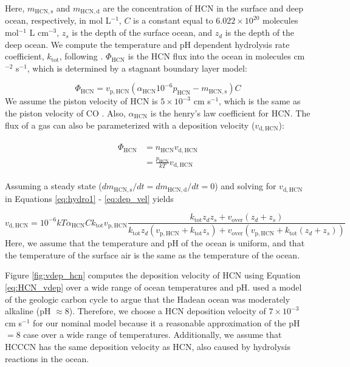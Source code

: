 Here, $m_\mathrm{HCN,s}$ and $m_\mathrm{HCN,d}$ are the concentration of HCN in the surface and deep ocean, respectively, in mol L$^{-1}$, $C$ is a constant equal to $6.022 \times 10^{20}$ molecules mol$^{-1}$ L cm$^{-3}$, $z_s$ is the depth of the surface ocean, and $z_d$ is the depth of the deep ocean. We compute the temperature and pH dependent hydrolysis rate coefficient, $k_\mathrm{tot}$, following \citet{Miyakawa_2002}. $\Phi_\mathrm{HCN}$ is the HCN flux into the ocean in molecules cm$^{-2}$ s$^{-1}$, which is determined by a stagnant boundary layer model:

\begin{equation} \label{eq:flux_lid}
  \Phi_\mathrm{HCN} = v_\mathrm{p,HCN} (\alpha_\mathrm{HCN} 10^{-6} p_\mathrm{HCN} - m_\mathrm{HCN,s}) C
\end{equation}
We assume the piston velocity of HCN is $5 \times 10^{-3}$ cm s$^{-1}$, which is the same as the piston velocity of CO \citep[Table 1]{Kharecha_2005}. Also, $\alpha_\mathrm{HCN}$ is the henry's law coefficient for HCN. The flux of a gas can also be parameterized with a deposition velocity ($v_\mathrm{d,HCN}$):

\begin{align}
\begin{split}
  \Phi_\mathrm{HCN} &= n_\mathrm{HCN} v_\mathrm{d,HCN} \\
  &= \frac{p_\mathrm{HCN}}{k T} v_\mathrm{d,HCN} \label{eq:dep_vel}
\end{split}
\end{align}

Assuming a steady state ($d m_\mathrm{HCN,s}/dt = d m_\mathrm{HCN,d}/dt = 0$) and solving for $v_\mathrm{d,HCN}$ in Equations \eqref{eq:hydro1} - \eqref{eq:dep_vel} yields

\begin{equation}
  v_\mathrm{d,HCN} = 10^{-6} k T \alpha_\mathrm{HCN} C k_\mathrm{tot} v_\mathrm{p,HCN} \frac{k_\mathrm{tot} z_d z_s + v_\mathrm{over} (z_d + z_s)}{k_\mathrm{tot} z_d (v_\mathrm{p,HCN} + k_\mathrm{tot} z_s) + v_\mathrm{over}(v_\mathrm{p,HCN} + k_\mathrm{tot} (z_d + z_s))} \label{eq:HCN_vdep}
\end{equation}
Here, we assume that the temperature and pH of the ocean is uniform, and that the temperature of the surface air is the same as the temperature of the ocean. 

Figure \ref{fig:vdep_hcn} computes the deposition velocity of HCN using Equation \eqref{eq:HCN_vdep} over a wide range of ocean temperatures and pH. \citet{Kadoya_2020} used a model of the geologic carbon cycle to argue that the Hadean ocean was moderately alkaline (pH $\approx 8$). Therefore, we choose a HCN deposition velocity of $7 \times 10^{-3}$ cm s$^{-1}$ for our nominal model because it a reasonable approximation of the pH $= 8$ case over a wide range of temperatures. Additionally, we assume that HCCCN has the same deposition velocity as HCN, also caused by hydrolysis reactions in the ocean.

